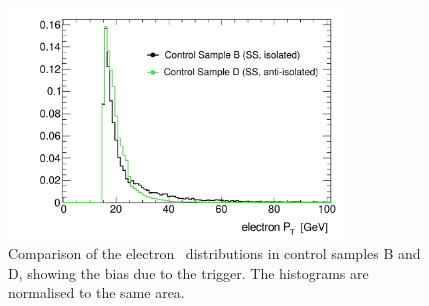 \begin{figure}[!p]
	\begin{center}
	\includegraphics[width=9cm]{figure/ABCD_regionB_Vs_regionD2}
	\end{center}
	\caption{Comparison of the electron \pt~distributions in control samples B and D, showing the bias due to the trigger. 
	The histograms are normalised to the same area.}
	\label{fig:BvsD}
\end{figure}


